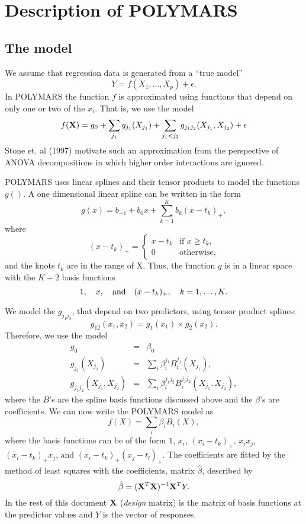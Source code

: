 \section{Description of POLYMARS}\label{van}
\subsection*{The model}
We assume that regression data is generated from a ``true model''
$$ Y =  f(X_1,\ldots,X_p)+\epsilon.$$ In POLYMARS the
function $f$ is approximated using functions that
depend on only one or two of the $x_i$. That is, we use the model
\[
f({\bf X}) =
g_0+\sum_{j_1}g_{j_1}(X_{j_1})+\sum_{j_1<j_2}g_{j_1j_2}(X_{j_1},X_{j_2})+\epsilon
\]
Stone et. al (1997)\cite{S} motivate such  an approximation from the
perspective of ANOVA decompositions in which higher order
interactions are ignored.

POLYMARS uses linear splines and their tensor products to model
the functions $g()$.
A one dimensional linear spline can be written in the form
\[
g(x)=b_{-1} + b_0 x + \sum_{k=1}^K b_k (x-t_k)_+,\]
where 
$$(x-t_k)_+ = \left \{ \begin{array}{ll}
                      x-t_k & \mbox{if $x \geq t_k$,} \\
                      0   & \mbox{otherwise,} \end{array} \right. $$
and the knots ${t_k}$ are in the range of X.  Thus, the function
$g$ is in a linear space with the $K+2$
basis functions 
\[
1, \quad x, \quad \mbox{and}\quad (x-t_k)_+ ,\hspace*{10pt} k=1,\ldots,K.
\]

We model the $g_{j_1j_2}$, that depend on two predictors,
using tensor product splines:
$$g_{12}(x_1,x_2) = g_1(x_1)\times g_2(x_2). $$
Therefore, we use the model
\begin{eqnarray}\nonumber
g_0 &=& \beta_0\\ 
g_{j_1}(X_{j_1}) &=& \sum_i\beta^{j_1}_iB^{j_1}_i(X_{j_1}),\nonumber\\
g_{j_1j_2}(X_{j_1},X_{j_2}) &=&
\sum_i\beta^{j_1j_2}_iB^{j_1j_2}_i(X_{j_1},X_{j_2}),\nonumber
\end{eqnarray}
where the $B$'s are the spline basis functions discussed above
and the $\beta$'s are coefficients.
We can now write the POLYMARS model as
$$ f(X) = \sum_i\beta_iB_i(X), $$
where the basis functions can be of the form
$1$, $x_i$, $(x_i-t_k)_+$, $x_ix_j$,
$(x_i-t_k)_+x_j$, and
$(x_i-t_k)_+(x_j-t_l)_+$.
The coefficients are fitted by the method of least squares with the
coefficients, matrix $\hat{\beta}$, described by 
\begin{equation}\label{matCOEF} 
\hat{\beta} =({\bf X}^T{\bf X})^{-1}{\bf X}^TY.
\end{equation}
In the rest of this document
$\bf{X}$ ({\em design} matrix)
is the matrix of basis functions at the predictor values and $Y$ is the
vector of responses.
